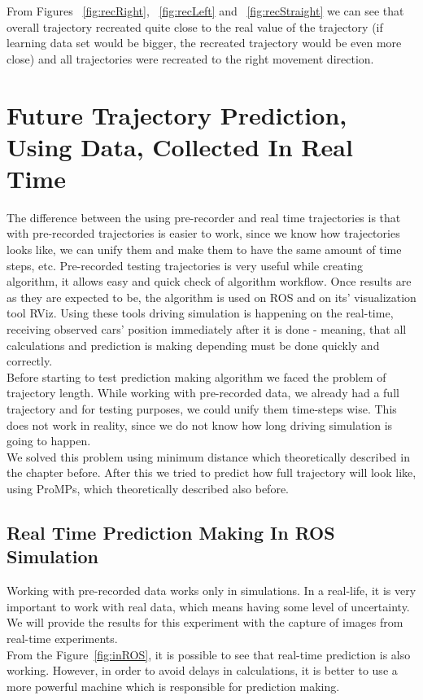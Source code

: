 From Figures ~\ref{fig:recRight}, ~\ref{fig:recLeft} and ~\ref{fig:recStraight} we can see that overall trajectory recreated quite close to the real value of the trajectory (if learning data set would be bigger, the recreated trajectory would be even more close) and all trajectories were recreated to the right movement direction.

\section{Future Trajectory Prediction, Using Data, Collected In Real Time}

The difference between the using pre-recorder and real time trajectories is that with pre-recorded trajectories is easier to work, since we know how trajectories looks like, we can unify them and make them to have the same amount of time steps, etc. Pre-recorded testing trajectories is very useful while creating algorithm, it allows easy and quick check of algorithm workflow. Once results are as they are expected to be, the algorithm is used on \gls{ROS} and on its' visualization tool \gls{RViz}. Using these tools driving simulation is happening on the real-time, receiving observed cars' position immediately after it is done - meaning, that all calculations and prediction is making depending must be done quickly and correctly. \\
Before starting to test prediction making algorithm we faced the problem of trajectory length. While working with pre-recorded data, we already had a full trajectory and for testing purposes, we could unify them time-steps wise. This does not work in reality, since we do not know how long driving simulation is going to happen. \\
We solved this problem using minimum distance which theoretically described in the chapter before. After this we tried to predict how full trajectory will look like, using \gls{ProMPs}, which theoretically described also before.

\subsection{Real Time Prediction Making In \gls{ROS} Simulation}

Working with pre-recorded data works only in simulations. In a real-life, it is very important to work with real data, which means having some level of uncertainty. We will provide the results for this experiment with the capture of images from real-time experiments. \\
From the Figure~\ref{fig:inROS}, it is possible to see that real-time prediction is also working. However, in order to avoid delays in calculations, it is better to use a more powerful machine which is responsible for prediction making.

